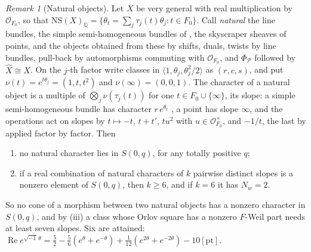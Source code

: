\documentclass[11pt,reqno]{amsart}
\theoremstyle{plain}
\theoremstyle{definition}
\theoremstyle{remark}
\newtheorem{remark}[theorem]{Remark}
\newcommand{\QQ}{\mathbb{Q}}
\newcommand{\cP}{\mathcal{P}}
\newcommand{\cO}{\mathcal{O}}
\newcommand{\NS}{\mathrm{NS}}
\begin{document}
\begin{remark}[Natural objects]\label{rem:sexticnatural}
Let $X$ be very general with real multiplication by $\cO_{F_{0}}$, so that
$\NS(X)_{\QQ}=\{\theta_{t}=\sum_{j}\tau_{j}(t)\theta_{j}:t\in F_{0}\}$. Call
\emph{natural} the line bundles, the simple semi-homogeneous bundles of
\cite{Muk78}, the skyscraper sheaves of points, and the objects obtained from
these by shifts, duals, twists by line bundles, pull-back by automorphisms
commuting with $\cO_{F_{0}}$, and $\Phi_{\cP}$ followed by $\widehat X\cong X$.
On the $j$-th factor write classes in $\langle1,\theta_{j},\theta_{j}^{2}/2
\rangle$ as $(r,c,s)$, and put $\nu(t)=e^{t\theta_{j}}=(1,t,t^{2})$ and
$\nu(\infty)=(0,0,1)$. The character of a natural object is a multiple of
$\bigotimes_{j}\nu(\tau_{j}(t))$ for one $t\in F_{0}\cup\{\infty\}$, its
slope: a simple semi-homogeneous bundle has character $r\,e^{\theta_{t}}$
\cite{Muk78}, a point has slope $\infty$, and the operations act on slopes by
$t\mapsto-t$, $t+t'$, $tu^{2}$ with $u\in\cO_{F_{0}}^{\times}$, and $-1/t$,
the last by \cite[Theorem~6.5]{paperI} applied factor by factor. Then
\begin{enumerate}[label=\textup{(\alph*)},leftmargin=2.6em,itemsep=2pt]
\item no natural character lies in $S(0,q)$, for any totally positive $q$;
\item if a real combination of natural characters of $k$ pairwise distinct
  slopes is a nonzero element of $S(0,q)$, then $k\ge6$, and if $k=6$ it has
  $N_{w}=2$.
\end{enumerate}
So no cone of a morphism between two natural objects has a nonzero character
in $S(0,q)$, and by (iii) a class whose Orlov square has
a nonzero $F$-Weil part needs at least seven slopes. Six are attained:
$\operatorname{Re}e^{\sqrt{-1}\,\theta}=\frac52-\frac56(e^{\theta}+e^{-\theta})
+\frac1{12}(e^{2\theta}+e^{-2\theta})-10[\mathrm{pt}]$.


\end{remark}
\end{document}
